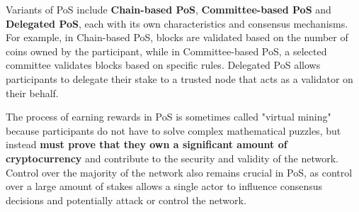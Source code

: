 Variants of PoS include \textbf{Chain-based PoS}, \textbf{Committee-based PoS} and \textbf{Delegated PoS}, each with its own characteristics and consensus mechanisms. For example, in Chain-based PoS, blocks are validated based on the number of coins owned by the participant, while in Committee-based PoS, a selected committee validates blocks based on specific rules. Delegated PoS allows participants to delegate their stake to a trusted node that acts as a validator on their behalf.

The process of earning rewards in PoS is sometimes called "virtual mining" because participants do not have to solve complex mathematical puzzles, but instead \textbf{must prove that they own a significant amount of cryptocurrency} and contribute to the security and validity of the network. Control over the majority of the network also remains crucial in PoS, as control over a large amount of stakes allows a single actor to influence consensus decisions and potentially attack or control the network.



